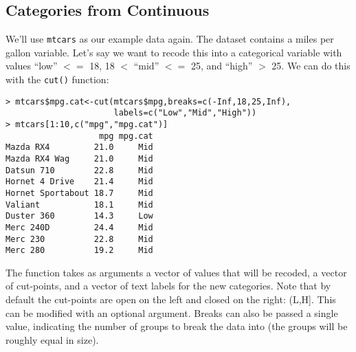 \documentclass[12pt, oneside]{amsart}   	%
\begin{document}
\subsection{Categories from Continuous}

We'll use \texttt{mtcars} as our example data again. The dataset contains a miles per gallon variable. Let's say we want to recode this into a categorical variable with values ``low'' $<=$ 18,  18 $<$ ``mid'' $<=$ 25, and ``high'' $>$ 25. We can do this with the \texttt{cut()} function:

\begin{verbatim}
> mtcars$mpg.cat<-cut(mtcars$mpg,breaks=c(-Inf,18,25,Inf),
					  labels=c("Low","Mid","High"))
> mtcars[1:10,c("mpg","mpg.cat")]
                   mpg mpg.cat
Mazda RX4         21.0     Mid
Mazda RX4 Wag     21.0     Mid
Datsun 710        22.8     Mid
Hornet 4 Drive    21.4     Mid
Hornet Sportabout 18.7     Mid
Valiant           18.1     Mid
Duster 360        14.3     Low
Merc 240D         24.4     Mid
Merc 230          22.8     Mid
Merc 280          19.2     Mid
\end{verbatim}

The function takes as arguments a vector of values that will be recoded, a vector of cut-points, and a vector of text labels for the new categories. Note that by default the cut-points are open on the left and closed on the right: (L,H]. This can be modified with an optional argument. Breaks can also be passed a single value, indicating the number of groups to break the data into (the groups will be roughly equal in size). 
\end{document}
